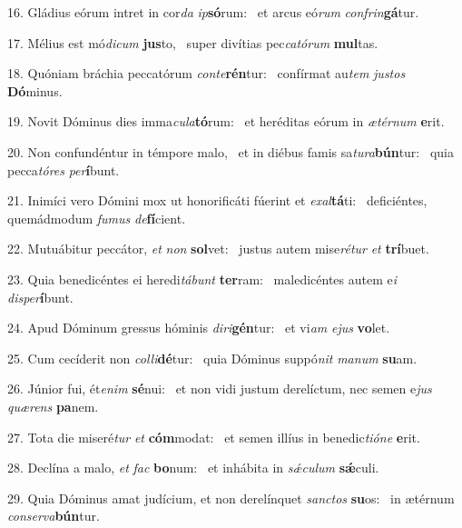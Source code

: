 16. Gládius eórum intret in cor\textit{da} \textit{ip}\textbf{só}rum: \ast\  et arcus eó\textit{rum} \textit{con}\textit{frin}\textbf{gá}tur.\

17. Mélius est mó\textit{di}\textit{cum} \textbf{jus}to, \ast\  super divítias pec\textit{ca}\textit{tó}\textit{rum} \textbf{mul}tas.\

18. Quóniam bráchia peccatórum \textit{con}\textit{te}\textbf{rén}tur: \ast\  confírmat au\textit{tem} \textit{jus}\textit{tos} \textbf{Dó}minus.\

19. Novit Dóminus dies imma\textit{cu}\textit{la}\textbf{tó}rum: \ast\  et heréditas eórum in \textit{æ}\textit{tér}\textit{num} \textbf{e}rit.\

20. Non confundéntur in témpore malo, \dag\  et in diébus famis sa\textit{tu}\textit{ra}\textbf{bún}tur: \ast\  quia pecca\textit{tó}\textit{res} \textit{per}\textbf{í}bunt.\

21. Inimíci vero Dómini mox ut honorificáti fúerint et \textit{ex}\textit{al}\textbf{tá}ti: \ast\  deficiéntes, quemádmodum \textit{fu}\textit{mus} \textit{de}\textbf{fí}cient.\

22. Mutuábitur peccátor, \textit{et} \textit{non} \textbf{sol}vet: \ast\  justus autem mise\textit{ré}\textit{tur} \textit{et} \textbf{trí}buet.\

23. Quia benedicéntes ei heredi\textit{tá}\textit{bunt} \textbf{ter}ram: \ast\  maledicéntes autem e\textit{i} \textit{dis}\textit{per}\textbf{í}bunt.\

24. Apud Dóminum gressus hóminis \textit{di}\textit{ri}\textbf{gén}tur: \ast\  et vi\textit{am} \textit{e}\textit{jus} \textbf{vo}let.\

25. Cum cecíderit non \textit{col}\textit{li}\textbf{dé}tur: \ast\  quia Dóminus suppó\textit{nit} \textit{ma}\textit{num} \textbf{su}am.\

26. Júnior fui, ét\textit{e}\textit{nim} \textbf{sé}nui: \ast\  et non vidi justum derelíctum, nec semen e\textit{jus} \textit{quæ}\textit{rens} \textbf{pa}nem.\

27. Tota die miseré\textit{tur} \textit{et} \textbf{cóm}modat: \ast\  et semen illíus in benedic\textit{ti}\textit{ó}\textit{ne} \textbf{e}rit.\

28. Declína a malo, \textit{et} \textit{fac} \textbf{bo}num: \ast\  et inhábita in \textit{sǽ}\textit{cu}\textit{lum} \textbf{sǽ}culi.\

29. Quia Dóminus amat judícium, et non derelínquet \textit{sanc}\textit{tos} \textbf{su}os: \ast\  in ætérnum \textit{con}\textit{ser}\textit{va}\textbf{bún}tur.\

